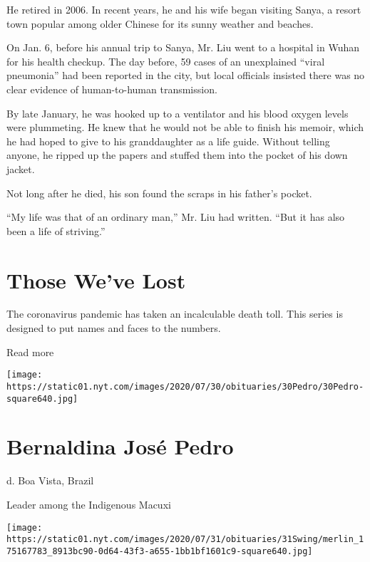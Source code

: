 He retired in 2006. In recent years, he and his wife began visiting
Sanya, a resort town popular among older Chinese for its sunny weather
and beaches.

On Jan. 6, before his annual trip to Sanya, Mr. Liu went to a hospital
in Wuhan for his health checkup. The day before, 59 cases of an
unexplained ``viral pneumonia'' had been reported in the city, but local
officials insisted there was no clear evidence of human-to-human
transmission.

By late January, he was hooked up to a ventilator and his blood oxygen
levels were plummeting. He knew that he would not be able to finish his
memoir, which he had hoped to give to his granddaughter as a life guide.
Without telling anyone, he ripped up the papers and stuffed them into
the pocket of his down jacket.

Not long after he died, his son found the scraps in his father's pocket.

``My life was that of an ordinary man,'' Mr. Liu had written. ``But it
has also been a life of striving.''

\href{https://www.nytimes.com/interactive/2020/obituaries/people-died-coronavirus-obituaries.html?action=click\&pgtype=Article\&state=default\&region=BELOW_MAIN_CONTENT\&context=covid_obits_promo}{}

\hypertarget{those-weve-lost}{%
\section{Those We've Lost}\label{those-weve-lost}}

The coronavirus pandemic has taken an incalculable death toll. This
series is designed to put names and faces to the numbers.

Read more

\texttt{[image: https://static01.nyt.com/images/2020/07/30/obituaries/30Pedro/30Pedro-square640.jpg]}

\hypertarget{bernaldina-josuxe9-pedro}{%
\section{Bernaldina José Pedro}\label{bernaldina-josuxe9-pedro}}

d. Boa Vista, Brazil

Leader among the Indigenous Macuxi

\texttt{[image: https://static01.nyt.com/images/2020/07/31/obituaries/31Swing/merlin\_175167783\_8913bc90-0d64-43f3-a655-1bb1bf1601c9-square640.jpg]}


